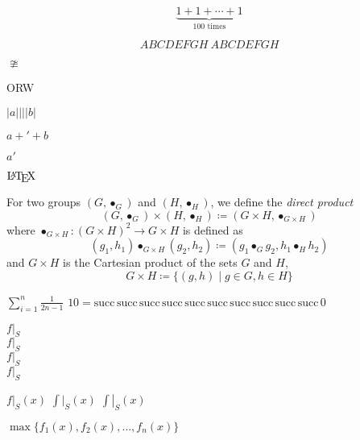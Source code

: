 \documentclass{article}
\newcommand*\restrict[2]{\ensuremath{#1|_{#2}}}
\newcommand*\arestrict[2]{\ensuremath{\left.#1\right|_{#2}}}
\begin{document}
\begin{equation*}
 \underbrace{
  1 + 1 + \dotsb + 1
 }_{\text{\(100\) times}}
\end{equation*}

\begin{equation*}
 \mathit{ABCDEFGH}\ ABCDEFGH
\end{equation*}

\(\ncong\)

{\Huge ORW}

\(\lvert a \rvert || \lvert b \rvert\)

\(a + \prime + b\)

\(a\prime\)

\(\text\LaTeX\)

For two groups \((G, \bullet_G)\) and \((H, \bullet_H)\), we define the
\emph{direct product}
\begin{equation*}
 (G, \bullet_G) \times (H, \bullet_H)
  \coloneqq (G \times H, \bullet_{G \times H})
\end{equation*}
where \(\bullet_{G \times H}: (G \times H)^2 \to G \times H\) is defined as
\begin{equation*}
 (g_1, h_1) \bullet_{G \times H} (g_2, h_2)
  \coloneqq (g_1 \bullet_G g_2, h_1 \bullet_H h_2)
\end{equation*}
and \(G \times H\) is the Cartesian product of the sets \(G\) and \(H\),
\begin{equation*}
 G \times H \coloneqq \{(g, h) \mid g \in G, h \in H\}
\end{equation*}

\(\sum_{i = 1}^n \frac 1{2n - 1}\)
\(10 = \mathrm{succ}\,\mathrm{succ}\,\mathrm{succ}\,\mathrm{succ}\,\mathrm{succ}\,\mathrm{succ}\,\mathrm{succ}\,\mathrm{succ}\,\mathrm{succ}\,\mathrm{succ}\,0\)

\(f\vert_S\) \\
\(f\rvert_S\) \\
\(f\lvert_S\) \\
\(f|_S\)

\(\restrict fS(x)\)
\(\displaystyle \restrict {\int}S(x)\)
\(\displaystyle \arestrict {\int}S(x)\)

\(\max\{f_1(x), f_2(x), \dotsc, f_n(x)\}\)
\end{document}

